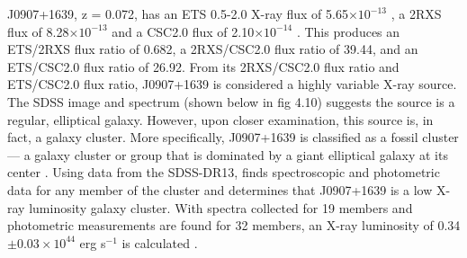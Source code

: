 J0907+1639, z = 0.072,  has an ETS 0.5-2.0 X-ray flux of 5.65$\times 10^{-13}$ \fluxunits, a 2RXS flux of 8.28$\times 10^{-13}$ \fluxunits and a CSC2.0 flux of 2.10$\times 10^{-14}$ \fluxunits. 
This produces an ETS/2RXS flux ratio of 0.682, a 2RXS/CSC2.0 flux ratio of 39.44, and an ETS/CSC2.0 flux ratio of 26.92. 
From its 2RXS/CSC2.0 flux ratio and ETS/CSC2.0 flux ratio, J0907+1639 is considered a highly variable X-ray source. 
The SDSS image and spectrum (shown below in fig 4.10) suggests the source is a regular, elliptical galaxy.
However, upon closer examination, this source is, in fact, a galaxy cluster. 
More specifically, J0907+1639 is classified as a fossil cluster --- a galaxy cluster or group that is dominated by a giant elliptical galaxy at its center \citep{veovodkin2010}. 
Using data from the SDSS-DR13, \cite{omill2019} finds spectroscopic and photometric data for any member of the cluster and determines that J0907+1639 is a low X-ray luminosity galaxy cluster. 
With spectra  collected for 19 members and photometric measurements are found for 32 members, an X-ray luminosity of 0.34$\pm 0.03 \times 10^{44}$ erg s$^{-1}$ is calculated \citep{omill2019}.


